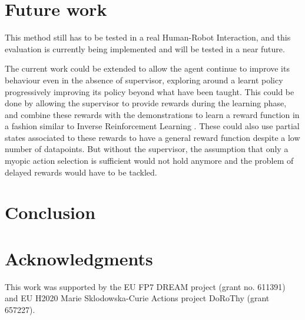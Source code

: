 \documentclass[letterpaper]{article} %
\begin{document}
\section{Future work}

This method still has to be tested in a real Human-Robot Interaction, and this
evaluation is currently being implemented and will be tested in a near future.

The current work could be extended to allow the agent continue to improve its
behaviour even in the absence of supervisor, exploring around a learnt policy
progressively improving its policy beyond what have been taught. This
could be done by allowing the supervisor to provide rewards during the learning
phase, and combine these rewards with the demonstrations to learn a reward
function in a fashion similar to Inverse Reinforcement Learning
\cite{abbeel2004apprenticeship}. These could also use partial states associated
to these rewards to have a general reward function despite a low number of
datapoints.
But without the supervisor, the assumption that only a
myopic action selection is sufficient would not hold anymore and the problem of
delayed rewards would have to be tackled.
\section{Conclusion}
\label{sec:conclusion}
\section{Acknowledgments}
This work was supported by the EU FP7 DREAM project (grant no.  611391) and EU
H2020 Marie Sklodowska-Curie Actions project DoRoThy (grant 657227).  

 
\end{document}
